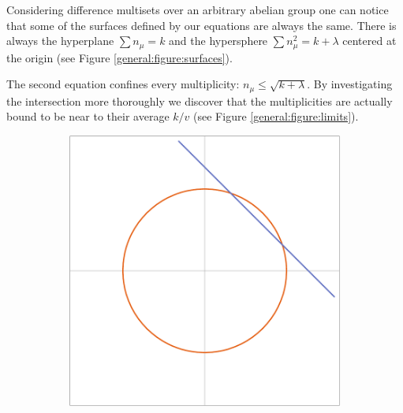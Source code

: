 Considering difference multisets over an arbitrary abelian group 
one can notice that some of the surfaces defined by our equations 
are always the same. There is always the hyperplane 
$\sum {n_\mu} = k$ and the hypersphere $\sum n_\mu^2 = k + \lambda$ 
centered at the origin (see Figure \ref{general:figure:surfaces}). 

The second equation confines every multiplicity: 
$n_\mu \leq \sqrt{k+\lambda}$. By investigating the intersection
more thoroughly we discover that the multiplicities are actually 
bound to be near to their average $k/v$ (see Figure \ref{general:figure:limits}).

\begin{figure}
	\centering
	\begin{subfigure}[b]{0.5\textwidth}
		\includegraphics[width=\textwidth]{assets/surfacesIn2D}
	\end{subfigure}%
	~
	\begin{subfigure}[b]{0.5\textwidth}

\end{subfigure}
\end{figure}
